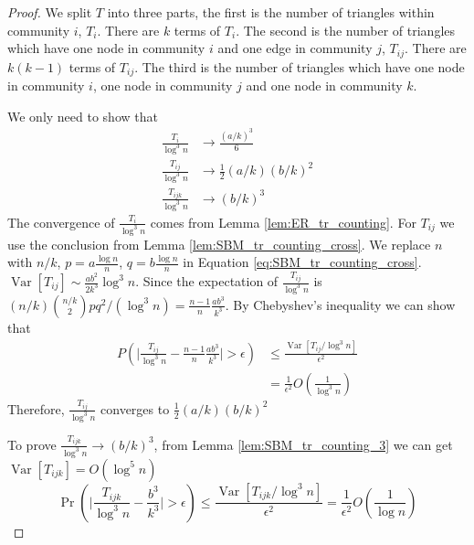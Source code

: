 \documentclass[journal]{IEEEtran}
\newcommand{\1}{\mathbbm{1}}
\DeclareMathOperator{\Var}{Var}
\begin{document}
\begin{proof}
	We split $T$ into three parts, the first is the number of triangles within community $i$, $T_i$. There are $k$ terms of $T_i$.
	The second is the number of triangles which have one node in community $i$ and one edge in community $j$, $T_{ij}$. There are $k(k-1)$ terms of $T_{ij}$. The third is the number of triangles which have one node in community $i$, one node in community $j$ and one node in community $k$.
	
	We only need to show that
	\begin{align}
	\frac{T_i}{\log ^3 n} &\to \frac{(a/k)^3}{6} \\
	\frac{T_{ij}}{\log^3 n}& \to \frac{1}{2}(a/k)(b/k)^2\\
	\frac{T_{ijk}}{\log^3 n} & \to (b/k)^3
	\end{align}
	The convergence of $\frac{T_i}{\log ^3 n}$ comes from Lemma \ref{lem:ER_tr_counting}.
	For $T_{ij}$ we use the conclusion from Lemma \ref{lem:SBM_tr_counting_cross}.
	We replace $n$ with $n/k$, $p=a\frac{\log n}{n}$, $q=b\frac{\log n}{n}$ in Equation \eqref{eq:SBM_tr_counting_cross}.
	$\Var[T_{ij}] \sim \frac{ab^2}{2k^3} \log^3 n$. Since the expectation of $\frac{T_{ij}}{\log^3 n}$ is $(n/k)\binom{n/k}{2}pq^2/(\log^3 n)
	=\frac{n-1}{n}\frac{ab^3}{k^3}$. By Chebyshev's inequality we can show that 
	\begin{align*}
	P( \Big|\frac{T_{ij}}{\log^3 n} - \frac{n-1}{n}\frac{ab^3}{k^3} \Big| > \epsilon) &\leq \frac{\Var[T_{ij} / \log^3 n]}{\epsilon^2} \\
	& = \frac{1}{\epsilon^2}
	O(\frac{1}{\log^3 n})
	\end{align*}
	Therefore, $\frac{T_{ij}}{\log^3 n} $ converges to $\frac{1}{2}(a/k)(b/k)^2$
	
	To prove $\frac{T_{ijk}}{\log^3 n}\to (b/k)^3$, from Lemma \ref{lem:SBM_tr_counting_3} we can get $\Var[T_{ijk}] = O(\log^5 n)$
	$$
	\Pr( \Big|\frac{T_{ijk}}{\log^3 n} -\frac{b^3}{k^3} \Big| > \epsilon) \leq \frac{\Var[T_{ijk} / \log^3 n]}{\epsilon^2} = \frac{1}{\epsilon^2}
	O(\frac{1}{\log n})
	$$
\end{proof}
\end{document}
